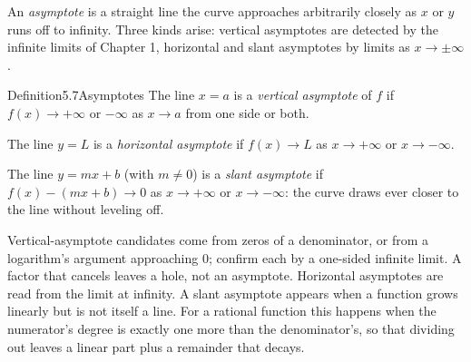 \documentclass[a4paper,12pt,oneside]{memoir}
\begin{document}
An \emph{asymptote} is a straight line the curve approaches arbitrarily closely as \(x\) or \(y\) runs off to infinity. Three kinds arise: vertical asymptotes are detected by the infinite limits of Chapter 1, horizontal and slant asymptotes by limits as \(x \to \pm\infty\).

\begin{envdefinition}{Definition}{5.7}{Asymptotes}
The line \(x = a\) is a \emph{vertical asymptote} of \(f\) if \(f(x) \to +\infty\) or \(-\infty\) as \(x \to a\) from one side or both.

The line \(y = L\) is a \emph{horizontal asymptote} if \(f(x) \to L\) as \(x \to +\infty\) or \(x \to -\infty\).

The line \(y = mx + b\) (with \(m \ne 0\)) is a \emph{slant asymptote} if \(f(x) - (mx + b) \to 0\) as \(x \to +\infty\) or \(x \to -\infty\): the curve draws ever closer to the line without leveling off.
\end{envdefinition}
Vertical-asymptote candidates come from zeros of a denominator, or from a logarithm’s argument approaching \(0\); confirm each by a one-sided infinite limit. A factor that cancels leaves a hole, not an asymptote. Horizontal asymptotes are read from the limit at infinity. A slant asymptote appears when a function grows linearly but is not itself a line. For a rational function this happens when the numerator’s degree is exactly one more than the denominator’s, so that dividing out leaves a linear part plus a remainder that decays.
\end{document}

